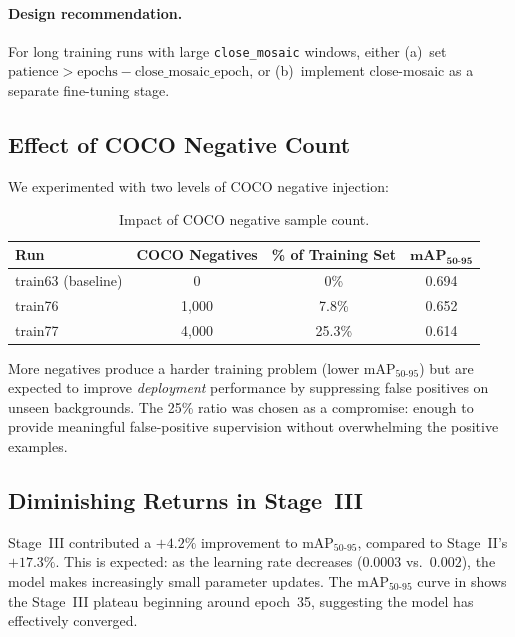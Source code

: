 \documentclass[11pt, a4paper]{article}
\newcommand{\mapfull}{\text{mAP}_{50\text{-}95}}
\begin{document}
\paragraph{Design recommendation.}  For long training runs with large \texttt{close\_mosaic} windows, either
(a)~set $\text{patience} > \text{epochs} - \text{close\_mosaic\_epoch}$, or
(b)~implement close-mosaic as a separate fine-tuning stage.

\subsection{Effect of COCO Negative Count}

We experimented with two levels of COCO negative injection:

\begin{table}[h]
  \centering
  \caption{Impact of COCO negative sample count.}
  \label{tab:coco_count}
  \begin{tabular}{@{}lccc@{}}
    \toprule
    \textbf{Run}       & \textbf{COCO Negatives} & \textbf{\% of Training Set} & $\mathbf{\mapfull}$ \\
    \midrule
    train63 (baseline) & 0                       & 0\%                         & 0.694               \\
    train76            & 1{,}000                 & 7.8\%                       & 0.652               \\
    train77            & 4{,}000                 & 25.3\%                      & 0.614               \\
    \bottomrule
  \end{tabular}
\end{table}

More negatives produce a harder training problem (lower $\mapfull$) but are
expected to improve \emph{deployment} performance by suppressing false
positives on unseen backgrounds. The 25\% ratio was chosen as a compromise:
enough to provide meaningful false-positive supervision without overwhelming
the positive examples.

\subsection{Diminishing Returns in Stage~III}

Stage~III contributed a $+4.2\%$ improvement to $\mapfull$, compared to
Stage~II's $+17.3\%$. This is expected: as the learning rate decreases
($0.0003$ vs.\ $0.002$), the model makes increasingly small parameter updates.
The $\mapfull$ curve in  shows the Stage~III plateau
beginning around epoch~35, suggesting the model has effectively converged.
\end{document}
